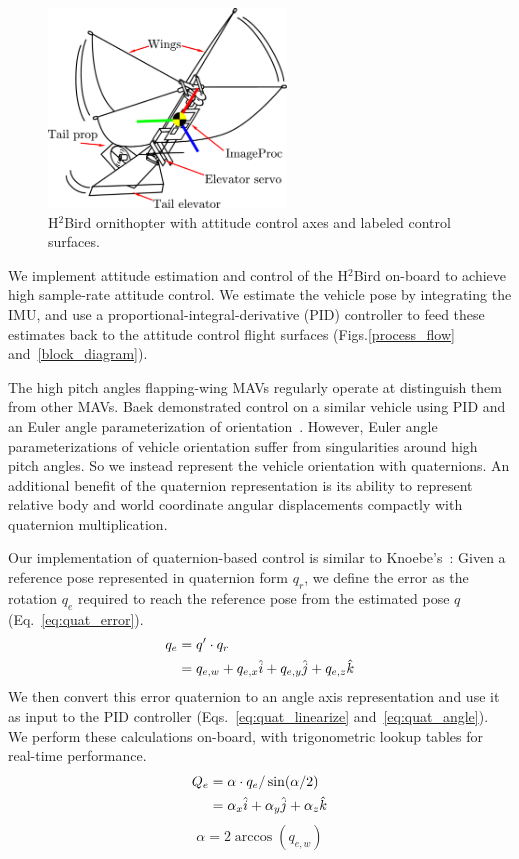 \documentclass{aamas2013}
\begin{document}
\begin{figure}[!tb]
\centering
\includegraphics[height=150pt]{figures/h2bird_axes.pdf}
\caption{H$^2$Bird ornithopter with attitude control axes and labeled control surfaces.}
\label{fig:h2Bird_axes}
\end{figure}

We implement attitude estimation and control of the H$^2$Bird on-board to achieve 
high sample-rate attitude control. We estimate the vehicle pose by
integrating the IMU, and use a proportional-integral-derivative (PID) 
controller to feed these estimates back to the attitude control flight surfaces (Figs.\ref{process_flow} and~\ref{block_diagram}).

The high pitch angles flapping-wing MAVs regularly operate at distinguish them 
from other MAVs. Baek demonstrated control on a similar vehicle using PID and an Euler angle
parameterization of orientation~\cite{baek:tracking}. However, Euler angle parameterizations of vehicle orientation 
suffer from singularities around high pitch angles. So we instead 
represent the vehicle orientation with quaternions. An additional benefit of 
the quaternion representation is its ability to represent relative body and 
world coordinate angular displacements compactly with quaternion multiplication.

Our implementation of quaternion-based control is similar to Knoebe's~\cite{knoebe:quatcontrol}:
Given a reference pose represented in quaternion form $q_r$, we define the error as the rotation $q_e$ 
required to reach the reference pose from the estimated pose $q$ (Eq.~\ref{eq:quat_error}). 
\begin{align}
\label{eq:quat_error}
q_e &= q^{\prime}\cdot q_r \\
		&= q_{e,w} + q_{e,x}\hat{i} + q_{e,y}\hat{j} + q_{e,z}\hat{k} \notag 
\end{align}
We then convert this error quaternion to an angle axis representation and use it 
as input to the PID controller (Eqs.~\ref{eq:quat_linearize} and~\ref{eq:quat_angle}).
We perform these calculations on-board, with trigonometric lookup tables for real-time performance.
\begin{align}
\label{eq:quat_linearize}
Q_e &= \alpha\cdot q_e/\sin(\alpha /2) \\
		&= \alpha_{x}\hat{i} + \alpha_{y}\hat{j} + \alpha_{z}\hat{k} \notag
\end{align}
\begin{equation}
\label{eq:quat_angle}
\alpha = 2\arccos(q_{e,w})
\end{equation}
\end{document}
